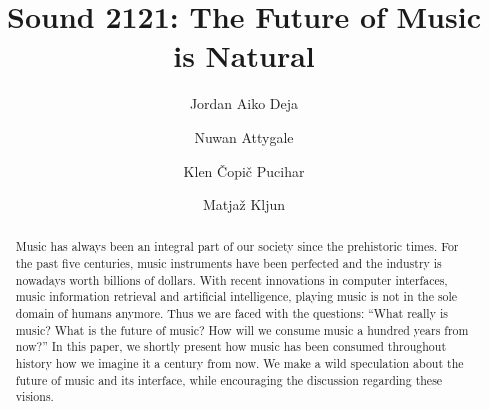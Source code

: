 \documentclass[sigchi]{acmart}
\begin{document}
\title{Sound 2121: The Future of Music is Natural}


\author{Jordan Aiko Deja}

\author{Nuwan Attygale}

\author{Klen Čopič Pucihar}

\author{Matjaž Kljun}


\begin{abstract}
 Music has always been an integral part of our society since the prehistoric times. For the past five centuries, music instruments have been perfected and the industry is nowadays worth billions of dollars. With recent innovations in computer interfaces, music information retrieval and artificial intelligence, playing music is not in the sole domain of humans anymore. Thus we are faced with the questions: ``What really is music? What is the future of music? How will we consume music a hundred years from now?'' In this paper, we shortly present how music has been consumed throughout history how we imagine it a century from now. We make a wild speculation about the future of music and its interface, while encouraging the discussion regarding these visions. 
\end{abstract}
\end{document}
